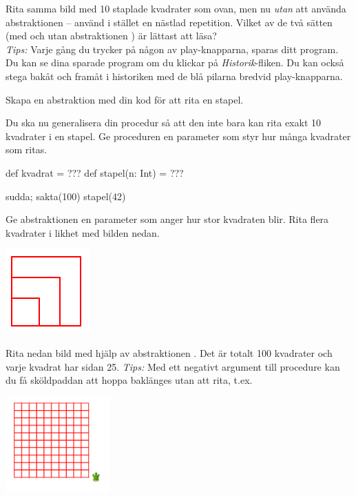 \Subtask Rita samma bild med 10 staplade kvadrater som ovan, men nu \emph{utan} att använda abstraktionen  -- använd i stället en nästlad repetition. Vilket av de två sätten (med och utan abstraktionen ) är lättast att läsa?\\ \emph{Tips:} Varje gång du trycker på någon av play-knapparna, sparas ditt program. Du kan se dina sparade program om du klickar på \emph{Historik}-fliken. Du kan också stega bakåt och framåt i historiken med de blå pilarna bredvid play-knapparna. 

\Subtask Skapa en abstraktion  med din kod för att rita en stapel.

\Subtask Du ska nu generalisera din procedur så att den inte bara kan rita exakt 10 kvadrater i en stapel. Ge proceduren  en parameter  som styr hur många kvadrater som ritas.
\begin{Code}
def kvadrat = ???
def stapel(n: Int) = ???

sudda; sakta(100)
stapel(42)
\end{Code}

\Subtask Ge abstraktionen  en parameter  som anger hur stor kvadraten blir. Rita flera kvadrater i likhet med bilden nedan.

\includegraphics{../img/kojo/square-param}

\Subtask Rita nedan bild med hjälp av abstraktionen . Det är totalt 100 kvadrater och varje kvadrat har sidan 25. \emph{Tips:} Med ett negativt argument till procedure  kan du få sköldpaddan att hoppa baklänges utan att rita, t.ex. 

\includegraphics[width=0.3\textwidth]{../img/kojo/square-grid}

